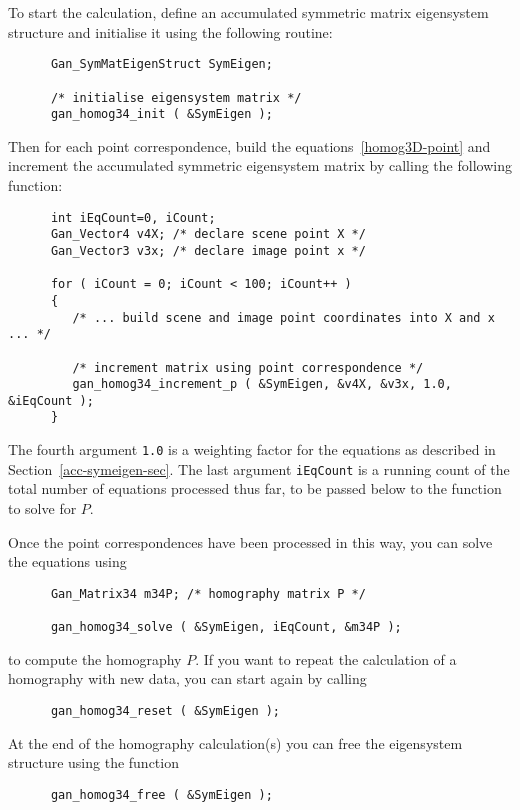 To start the calculation, define an accumulated symmetric matrix eigensystem
structure and initialise it using the following routine:
\begin{verbatim}
      Gan_SymMatEigenStruct SymEigen;

      /* initialise eigensystem matrix */
      gan_homog34_init ( &SymEigen );  
\end{verbatim}
Then for each point correspondence, build the equations~\ref{homog3D-point}
and increment the accumulated symmetric eigensystem matrix
by calling the following function:
\begin{verbatim}
      int iEqCount=0, iCount;
      Gan_Vector4 v4X; /* declare scene point X */
      Gan_Vector3 v3x; /* declare image point x */

      for ( iCount = 0; iCount < 100; iCount++ )
      {
         /* ... build scene and image point coordinates into X and x ... */

         /* increment matrix using point correspondence */
         gan_homog34_increment_p ( &SymEigen, &v4X, &v3x, 1.0, &iEqCount );
      }
\end{verbatim}
The fourth argument {\tt 1.0} is a weighting factor for the equations as
described in Section~\ref{acc-symeigen-sec}. The last argument {\tt iEqCount}
is a running count of the total number of equations processed thus far,
to be passed below to the function to solve for $P$.

Once the point correspondences have been processed in this way,
you can solve the equations using
\begin{verbatim}
      Gan_Matrix34 m34P; /* homography matrix P */

      gan_homog34_solve ( &SymEigen, iEqCount, &m34P );
\end{verbatim}
to compute the homography $P$. If you want to repeat the calculation of
a homography with new data, you can start again by calling
\begin{verbatim}
      gan_homog34_reset ( &SymEigen );
\end{verbatim}

At the end of the homography calculation(s) you can free the eigensystem
structure using the function
\begin{verbatim}
      gan_homog34_free ( &SymEigen );
\end{verbatim}

